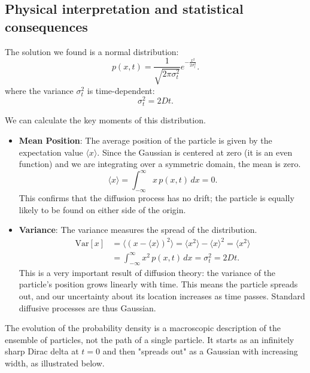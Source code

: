 \subsection{Physical interpretation and statistical consequences}
The solution we found is a  normal distribution:
\[
p(x,t) = \frac{1}{\sqrt{2\pi\sigma_t^2}} e^{-\frac{x^2}{2\sigma_t^2}}.
\]
where the variance $\sigma_t^2$ is time-dependent:
\[
\sigma_t^2 = 2Dt.
\]


We can calculate the key moments of this distribution.
\begin{itemize}
    \item \textbf{Mean Position}: The average position of the particle is given by the expectation value $\langle x \rangle$. Since the Gaussian is centered at zero (it is an even function) and we are integrating over a symmetric domain, the mean is zero.
    \[
    \langle x \rangle = \int_{-\infty}^{\infty} x \, p(x,t) \,dx = 0.
    \]
    This confirms that the diffusion process has no drift; the particle is equally likely to be found on either side of the origin.

    \item \textbf{Variance}: The variance measures the spread of the distribution.
    \begin{align*}
        \text{Var}[x] &= \langle (x - \langle x \rangle)^2 \rangle = \langle x^2 \rangle - \langle x \rangle^2 = \langle x^2 \rangle \\
        &= \int_{-\infty}^{\infty} x^2 \, p(x,t) \,dx = \sigma_t^2 = 2Dt.
    \end{align*}
    This is a very important result of diffusion theory: the variance of the particle's position grows linearly with time. This means the particle spreads out, and our uncertainty about its location increases as time passes. Standard diffusive processes are thus Gaussian.
\end{itemize}

The evolution of the probability density is a macroscopic description of the ensemble of particles, not the path of a single particle. It starts as an infinitely sharp Dirac delta at $t=0$ and then "spreads out" as a Gaussian with increasing width, as illustrated below.

